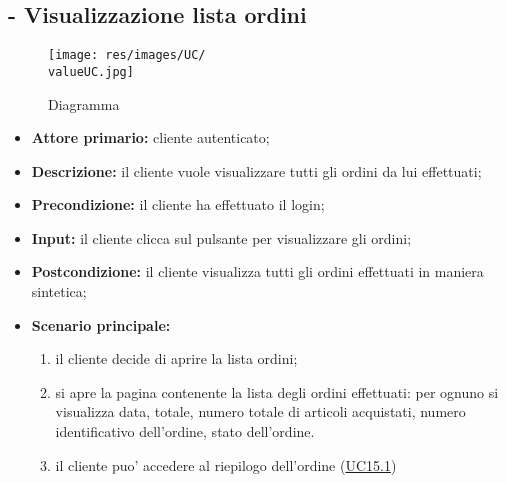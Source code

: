 \stepUserCase
\subsection{ - Visualizzazione lista ordini}
\begin{figure}[H]
    \centering
    \texttt{[image: res/images/UC/\\valueUC.jpg]}
    \caption{Diagramma }
\end{figure}
\begin{itemize}
    \item \textbf{Attore primario:} cliente autenticato;
    \item \textbf{Descrizione:} il cliente vuole visualizzare tutti gli ordini da lui effettuati;
    \item \textbf{Precondizione:} il cliente ha effettuato il login;
    \item \textbf{Input:} il cliente clicca sul pulsante per visualizzare gli ordini;
    \item \textbf{Postcondizione:} il cliente visualizza tutti gli ordini effettuati in maniera sintetica;
    \item \textbf{Scenario principale:}
          \begin{enumerate}
              \item il cliente decide di aprire la lista ordini;
              \item si apre la pagina contenente la lista degli ordini effettuati: per ognuno si visualizza data, totale, numero totale di articoli acquistati, numero identificativo dell'ordine, stato dell'ordine.
              \item il cliente puo' accedere al riepilogo dell'ordine (\hyperref[UC15.1]{UC15.1})
          \end{enumerate}
\end{itemize}

\stepsubUserCase
